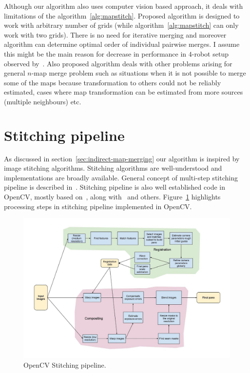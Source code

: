 Although our algorithm also uses computer vision based approach, it deals with limitations of the algorithm~\ref{alg:mapstitch}. Proposed algorithm is designed to work with arbitrary number of grids (while algorithm~\ref{alg:mapstitch} can only work with two grids). There is no need for iterative merging and moreover algorithm can determine optimal order of individual pairwise merges. I assume this might be the main reason for decrease in performance in $4$-robot setup observed by~\cite{Andre2014}. Also proposed algorithm deals with other problems arising for general $n$-map merge problem such as situations when it is not possible to merge some of the maps because transformation to others could not be reliably estimated, cases where map transformation can be estimated from more sources (multiple neighbours) etc.

\section{Stitching pipeline} %
\label{sec:stitchingpipeline}

As discussed in section~\ref{sec:indirect-map-merging} our algorithm is inspired by image stitching algorithms. Stitching algorithms are well-understood and implementations are broadly available. General concept of multi-step stitching pipeline is described in~\cite{Brown2006}. Stitching pipeline is also well established code in \gls{OpenCV}, mostly based on~\cite{Brown2006}, along with~\cite{Szeliski2004} \cite{Shum1998} and others. Figure~\ref{fig:opencv} highlights processing steps in stitching pipeline implemented in \gls{OpenCV}.

\begin{figure}
	\centering
	\includegraphics[width=\textwidth]{../img/StitchingPipeline.jpg}
	\caption{\gls{OpenCV} Stitching pipeline.}
	\label{fig:opencv}
\end{figure}

